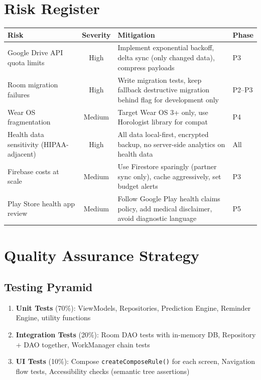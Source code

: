 \documentclass[12pt,a4paper]{article}
\begin{document}
\section{Risk Register}

\begin{tabularx}{\textwidth}{p{3.5cm}cp{5cm}X}
\toprule
\textbf{Risk} & \textbf{Severity} & \textbf{Mitigation} & \textbf{Phase} \\
\midrule
Google Drive API quota limits & High & Implement exponential backoff, delta sync (only changed data), compress payloads & P3 \\
Room migration failures & High & Write migration tests, keep fallback destructive migration behind flag for development only & P2--P3 \\
Wear OS fragmentation & Medium & Target Wear OS 3+ only, use Horologist library for compat & P4 \\
Health data sensitivity (HIPAA-adjacent) & High & All data local-first, encrypted backup, no server-side analytics on health data & All \\
Firebase costs at scale & Medium & Use Firestore sparingly (partner sync only), cache aggressively, set budget alerts & P3 \\
Play Store health app review & Medium & Follow Google Play health claims policy, add medical disclaimer, avoid diagnostic language & P5 \\
\bottomrule
\end{tabularx}

\section{Quality Assurance Strategy}

\subsection{Testing Pyramid}
\begin{enumerate}[leftmargin=1.5em]
  \item \textbf{Unit Tests} (70\%): ViewModels, Repositories, Prediction Engine, Reminder Engine, utility functions
  \item \textbf{Integration Tests} (20\%): Room DAO tests with in-memory DB, Repository + DAO together, WorkManager chain tests
  \item \textbf{UI Tests} (10\%): Compose \texttt{createComposeRule()} for each screen, Navigation flow tests, Accessibility checks (semantic tree assertions)
\end{enumerate}
\end{document}
